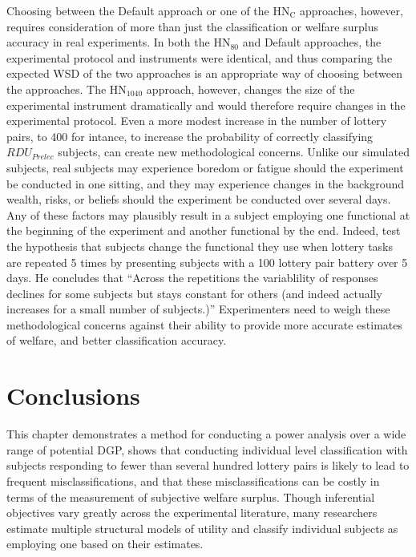 \documentclass[../main.tex]{subfiles}
\begin{document}
Choosing between the Default approach or one of the $\text{HN}_\text{C}$ approaches, however, requires consideration of more than just the classification or welfare surplus accuracy in real experiments.
In both the $\text{HN}_{80}$ and Default approaches, the experimental protocol and instruments were identical, and thus comparing the expected WSD of the two approaches is an appropriate way of choosing between the approaches.
The $\text{HN}_{1040}$ approach, however, changes the size of the experimental instrument dramatically and would therefore require changes in the experimental protocol.
Even a more modest increase in the number of lottery pairs, to 400 for intance, to increase the probability of correctly classifying $\mathit{RDU_{Prelec}}$ subjects, can create new methodological concerns.
Unlike our simulated subjects, real subjects may experience boredom or fatigue should the experiment be conducted in one sitting, and they may experience changes in the background wealth, risks, or beliefs should the experiment be conducted over several days.
Any of these factors may plausibly result in a subject employing one functional at the beginning of the experiment and another functional by the end.
Indeed, \textcite{Hey2001} test the hypothesis that subjects change the functional they use when lottery tasks are repeated 5 times by presenting subjects with a 100 lottery pair battery over 5 days.
He concludes that \enquote{Across the repetitions the variablility of responses declines for some subjects but stays constant for others (and indeed actually increases for a small number of subjects.)}
Experimenters need to weigh these methodological concerns against their ability to provide more accurate estimates of welfare, and better classification accuracy.

\singlespacing
\section{Conclusions}
\doublespacing

This chapter demonstrates a method for conducting a power analysis over a wide range of potential DGP, shows that conducting individual level classification with subjects responding to fewer than several hundred lottery pairs is likely to lead to frequent misclassifications, and that these misclassifications can be costly in terms of the measurement of subjective welfare surplus.
Though inferential objectives vary greatly across the experimental literature, many researchers estimate multiple structural models of utility and classify individual subjects as employing one based on their estimates.
\end{document}
